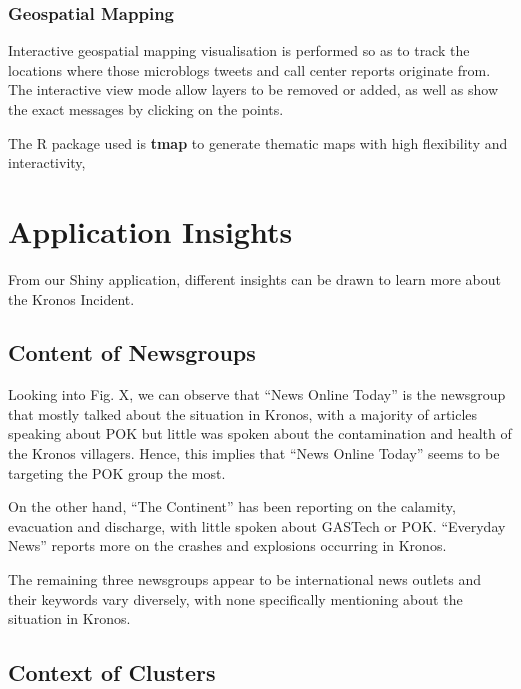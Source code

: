 \documentclass{acm_proc_article-sp}
\begin{document}
\hypertarget{geospatial-mapping}{%
\subsubsection{Geospatial Mapping}\label{geospatial-mapping}}

Interactive geospatial mapping visualisation is performed so as to track
the locations where those microblogs tweets and call center reports
originate from. The interactive view mode allow layers to be removed or
added, as well as show the exact messages by clicking on the points.

The R package used is \textbf{tmap} to generate thematic maps with high
flexibility and interactivity,

\hypertarget{application-insights}{%
\section{Application Insights}\label{application-insights}}

From our Shiny application, different insights can be drawn to learn
more about the Kronos Incident.

\hypertarget{content-of-newsgroups}{%
\subsection{Content of Newsgroups}\label{content-of-newsgroups}}

Looking into Fig. X, we can observe that ``News Online Today'' is the
newsgroup that mostly talked about the situation in Kronos, with a
majority of articles speaking about POK but little was spoken about the
contamination and health of the Kronos villagers. Hence, this implies
that ``News Online Today'' seems to be targeting the POK group the most.

On the other hand, ``The Continent'' has been reporting on the calamity,
evacuation and discharge, with little spoken about GASTech or POK.
``Everyday News'' reports more on the crashes and explosions occurring
in Kronos.

The remaining three newsgroups appear to be international news outlets
and their keywords vary diversely, with none specifically mentioning
about the situation in Kronos.

\hypertarget{context-of-clusters}{%
\subsection{Context of Clusters}\label{context-of-clusters}}
\end{document}
